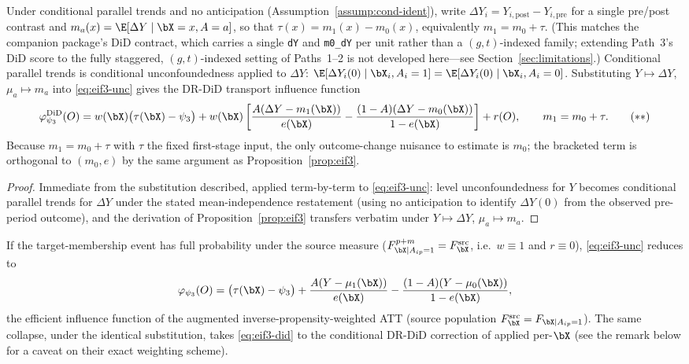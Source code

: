 \documentclass{article}
\begin{document}
\begin{proposition}
\label{prop:eif3-did}
Under conditional parallel trends and no anticipation (Assumption~\ref{assump:cond-ident}), write $\Delta Y_i = Y_{i,\mathrm{post}}-Y_{i,\mathrm{pre}}$ for a single pre/post contrast and $m_a(x) = \E[\Delta Y\mid \bX=x,A=a]$, so that $\tau(x)=m_1(x)-m_0(x)$, equivalently $m_1=m_0+\tau$. (This matches the companion package's DiD contract, which carries a single \texttt{dY} and \texttt{m0\_dY} per unit rather than a $(g,t)$-indexed family; extending Path~3's DiD score to the fully staggered, $(g,t)$-indexed setting of Paths~1--2 is not developed here---see Section~\ref{sec:limitations}.) Conditional parallel trends is conditional unconfoundedness applied to $\Delta Y$: $\E[\Delta Y_i(0)\mid \bX_i,A_i=1] = \E[\Delta Y_i(0)\mid \bX_i,A_i=0]$. Substituting $Y\mapsto\Delta Y$, $\mu_a\mapsto m_a$ into \eqref{eq:eif3-unc} gives the DR-DiD transport influence function
\begin{equation}
\varphi_{\psi_3}^{\mathrm{DiD}}(O) = w(\bX)\bigl(\tau(\bX)-\psi_3\bigr) + w(\bX)\left[\frac{A(\Delta Y - m_1(\bX))}{e(\bX)} - \frac{(1-A)(\Delta Y - m_0(\bX))}{1-e(\bX)}\right] + r(O), \qquad m_1 = m_0+\tau. \tag{$\ast\ast$}
\label{eq:eif3-did}
\end{equation}
Because $m_1=m_0+\tau$ with $\tau$ the fixed first-stage input, the only outcome-change nuisance to estimate is $m_0$; the bracketed term is orthogonal to $(m_0,e)$ by the same argument as Proposition~\ref{prop:eif3}.
\end{proposition}

\begin{proof}
Immediate from the substitution described, applied term-by-term to \eqref{eq:eif3-unc}: level unconfoundedness for $Y$ becomes conditional parallel trends for $\Delta Y$ under the stated mean-independence restatement (using no anticipation to identify $\Delta Y(0)$ from the observed pre-period outcome), and the derivation of Proposition~\ref{prop:eif3} transfers verbatim under $Y\mapsto\Delta Y$, $\mu_a\mapsto m_a$.
\end{proof}

\begin{lemma}
\label{lem:collapse}
If the target-membership event has full probability under the source measure ($F^{p+m}_{\bX\mid A_{ip}=1} = F^{\mathrm{src}}_\bX$, i.e.\ $w\equiv 1$ and $r\equiv 0$), \eqref{eq:eif3-unc} reduces to
\[
\varphi_{\psi_3}(O) = \bigl(\tau(\bX)-\psi_3\bigr) + \frac{A(Y-\mu_1(\bX))}{e(\bX)} - \frac{(1-A)(Y-\mu_0(\bX))}{1-e(\bX)},
\]
the efficient influence function of the augmented inverse-propensity-weighted ATT (source population $F^{\mathrm{src}}_\bX = F_{\bX\mid A_{ip}=1}$). The same collapse, under the identical substitution, takes \eqref{eq:eif3-did} to the conditional DR-DiD correction of \citet{santannaDoublyRobustDifferenceindifferences2020} applied per-$\bX$ (see the remark below for a caveat on their exact weighting scheme).
\end{lemma}
\end{document}
